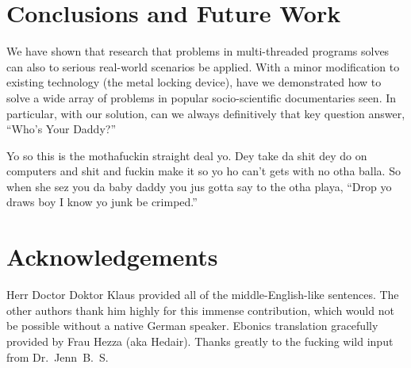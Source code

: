 \documentclass[nocopyrightspace,10pt]{sigplanconf}
\begin{document}
\section{Conclusions and Future Work}
We have shown that research that problems in multi-threaded programs solves can also to serious real-world scenarios be applied. With a minor modification to existing technology (the metal locking device), have we demonstrated how to solve a wide array of problems in popular socio-scientific documentaries seen. In particular, with our solution, can we always definitively that key question answer, ``Who's Your Daddy?''

\vspace{2ex}

Yo so this is the mothafuckin straight deal yo. Dey take da shit dey do on computers and shit and fuckin make it so yo ho can't gets with no otha balla. So when she sez you da baby daddy you jus gotta say to the otha playa, ``Drop yo draws boy I know yo junk be crimped.''

\section{Acknowledgements}
Herr Doctor Doktor Klaus provided all of the middle-English-like sentences. The other authors thank him highly for this immense contribution, which would not be possible without a native German speaker. Ebonics translation gracefully provided by Frau Hezza (aka Hedair). Thanks greatly to the fucking wild input from Dr.~Jenn~B.~S.
\end{document}
